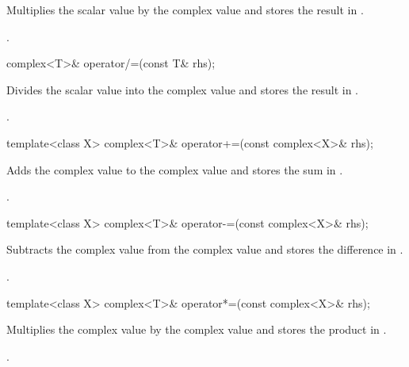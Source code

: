 \begin{itemdescr}
\pnum
\effects
Multiplies the scalar value  by the complex value
and stores the result in
.

\pnum
\returns
{}.
\end{itemdescr}

%
\begin{itemdecl}
complex<T>& operator/=(const T& rhs);
\end{itemdecl}

\begin{itemdescr}
\pnum
\effects
Divides the scalar value  into the complex value
and stores the result in
.

\pnum
\returns
{}.
\end{itemdescr}

%
\begin{itemdecl}
template<class X> complex<T>& operator+=(const complex<X>& rhs);
\end{itemdecl}

\begin{itemdescr}
\pnum
\effects
Adds the complex value  to the complex value
and stores the sum in
.

\pnum
\returns
{}.
\end{itemdescr}

%
\begin{itemdecl}
template<class X> complex<T>& operator-=(const complex<X>& rhs);
\end{itemdecl}

\begin{itemdescr}
\pnum
\effects
Subtracts the complex value  from the complex value
and stores the difference in
.

\pnum
\returns
{}.
\end{itemdescr}

%
\begin{itemdecl}
template<class X> complex<T>& operator*=(const complex<X>& rhs);
\end{itemdecl}

\begin{itemdescr}
\pnum
\effects
Multiplies the complex value  by the complex value
and stores the product in
.

\returns
{}.
\end{itemdescr}

